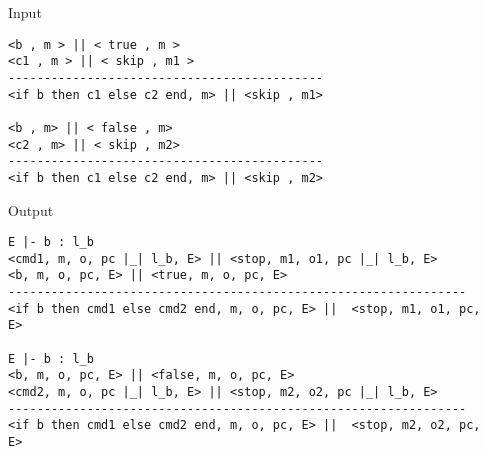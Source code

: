 \documentclass[final]{beamer}
\newlength{\onecolwid}
\newlength{\twocolwid}
\begin{document}
\begin{frame}[fragile]
\begin{columns}[t]
\begin{column}{\twocolwid}
\noindent
\begin{minipage}[t]{0.48\linewidth}
\begin{alertblock}{Input}
\begin{lstlisting}[basicstyle=\small]
<b , m > || < true , m >
<c1 , m > || < skip , m1 >
--------------------------------------------
<if b then c1 else c2 end, m> || <skip , m1>

<b , m> || < false , m>
<c2 , m> || < skip , m2>
--------------------------------------------
<if b then c1 else c2 end, m> || <skip , m2>
\end{lstlisting}        
\end{alertblock}
\end{minipage}
\hfill%
\begin{minipage}[t]{0.48\linewidth}
\begin{alertblock}{Output}
\begin{lstlisting}
E |- b : l_b
<cmd1, m, o, pc |_| l_b, E> || <stop, m1, o1, pc |_| l_b, E>
<b, m, o, pc, E> || <true, m, o, pc, E>
----------------------------------------------------------------
<if b then cmd1 else cmd2 end, m, o, pc, E> ||  <stop, m1, o1, pc, E>

E |- b : l_b
<b, m, o, pc, E> || <false, m, o, pc, E>
<cmd2, m, o, pc |_| l_b, E> || <stop, m2, o2, pc |_| l_b, E>
----------------------------------------------------------------
<if b then cmd1 else cmd2 end, m, o, pc, E> ||  <stop, m2, o2, pc, E>
\end{lstlisting}
\end{alertblock}
\end{minipage}






\end{column}

\begin{column}{\onecolwid}


\end{column}
\end{columns}
\end{frame}
\end{document}

